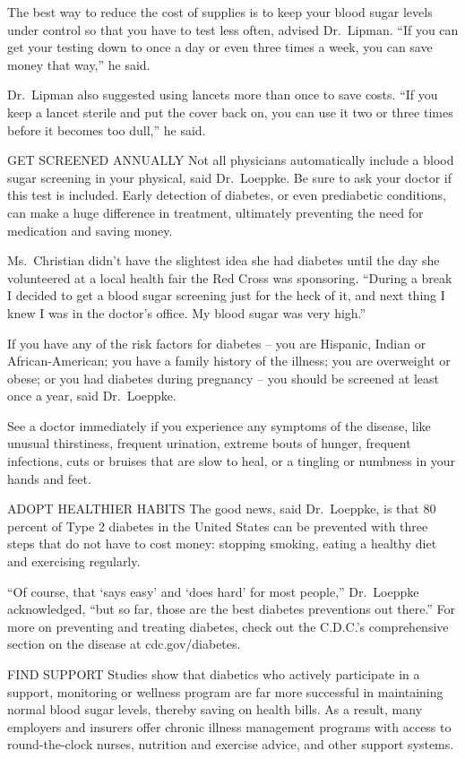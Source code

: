 ﻿\documentclass[12pt]{article}
\begin{document}
The best way to reduce the cost of supplies is to keep your blood sugar levels under control so that
you have to test less often, advised Dr.~Lipman. ``If you can get your testing down to once a day or
even three times a week, you can save money that way,'' he said.

Dr.~Lipman also suggested using lancets more than once to save costs. ``If you keep a lancet sterile
and put the cover back on, you can use it two or three times before it becomes too dull,'' he said.

GET SCREENED ANNUALLY Not all physicians automatically include a blood sugar screening in your
physical, said Dr.~Loeppke. Be sure to ask your doctor if this test is included. Early detection of
diabetes, or even prediabetic conditions, can make a huge difference in treatment, ultimately
preventing the need for medication and saving money.

Ms.~Christian didn't have the slightest idea she had diabetes until the day she volunteered at a
local health fair the Red Cross was sponsoring. ``During a break I decided to get a blood sugar
screening just for the heck of it, and next thing I knew I was in the doctor's office. My blood
sugar was very high.''

If you have any of the risk factors for diabetes -- you are Hispanic, Indian or African-American;
you have a family history of the illness; you are overweight or obese; or you had diabetes during
pregnancy -- you should be screened at least once a year, said Dr.~Loeppke.

See a doctor immediately if you experience any symptoms of the disease, like unusual thirstiness,
frequent urination, extreme bouts of hunger, frequent infections, cuts or bruises that are slow to
heal, or a tingling or numbness in your hands and feet.

ADOPT HEALTHIER HABITS The good news, said Dr.~Loeppke, is that 80 percent of Type 2 diabetes in the
United States can be prevented with three steps that do not have to cost money: stopping smoking,
eating a healthy diet and exercising regularly.

``Of course, that `says easy' and `does hard' for most people,'' Dr.~Loeppke acknowledged, ``but so
far, those are the best diabetes preventions out there.'' For more on preventing and treating
diabetes, check out the C.D.C.'s comprehensive section on the disease at cdc.gov/diabetes.

FIND SUPPORT Studies show that diabetics who actively participate in a support, monitoring or
wellness program are far more successful in maintaining normal blood sugar levels, thereby saving on
health bills. As a result, many employers and insurers offer chronic illness management programs
with access to round-the-clock nurses, nutrition and exercise advice, and other support systems.
\end{document}
